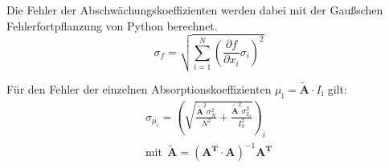 Die Fehler der Abschwächungskoeffizienten werden dabei mit der Gaußschen Fehlerfortpflanzung von Python berechnet.
\begin{equation}
  \sigma_f = \sqrt{
      \sum\limits_{i = 1}^N
       \left( \frac{\partial f}{\partial x_i} \sigma_i \right)^{\!\! 2}
     }
\end{equation}

Für den Fehler der einzelnen Absorptionskoeffizienten $\mu_{\mathrm{i}}= \symbf{\tilde{A}} \cdot I_{\mathrm{i}}$ gilt:
\begin{align*}
  \sigma_{\mu_i} = \left(\sqrt{\frac{\symbf{\tilde{A}}^2 \sigma_{N}^2}{N^2} + \frac{\symbf{\tilde{A}}^{2} \sigma_{I_{0}}^2}{I_{0}^2}}\right)_i \\
  \text{mit}\:\: \symbf{\tilde{A}} = \left(\symbf{A^T} \cdot \symbf{A}\right)^{-1} \symbf{A^T}
\end{align*}

